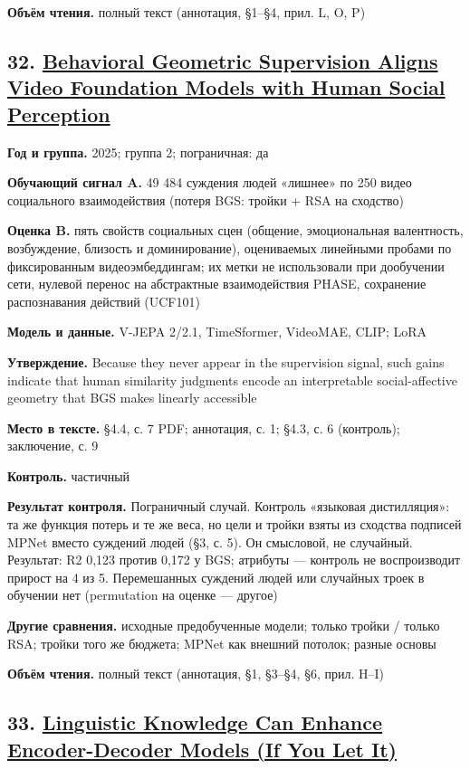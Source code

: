 \textbf{Объём чтения.} полный текст (аннотация, §1–§4, прил. L, O, P)


\subsection*{32. \href{https://doi.org/10.48550/arxiv.2510.01502}{Behavioral Geometric Supervision Aligns Video Foundation Models with Human Social Perception}}

\textbf{Год и группа.} 2025; группа 2; пограничная: да

\textbf{Обучающий сигнал A.} 49 484 суждения людей «лишнее» по 250 видео социального взаимодействия (потеря BGS: тройки + RSA на сходство)

\textbf{Оценка B.} пять свойств социальных сцен (общение, эмоциональная валентность, возбуждение, близость и доминирование), оцениваемых линейными пробами по фиксированным видеоэмбеддингам; их метки не использовали при дообучении сети, нулевой перенос на абстрактные взаимодействия PHASE, сохранение распознавания действий (UCF101)

\textbf{Модель и данные.} V-JEPA 2/2.1, TimeSformer, VideoMAE, CLIP; LoRA

\textbf{Утверждение.} Because they never appear in the supervision signal, such gains indicate that human similarity judgments encode an interpretable social-affective geometry that BGS makes linearly accessible

\textbf{Место в тексте.} §4.4, с. 7 PDF; аннотация, с. 1; §4.3, с. 6 (контроль); заключение, с. 9

\textbf{Контроль.} частичный

\textbf{Результат контроля.} Пограничный случай. Контроль «языковая дистилляция»: та же функция потерь и те же веса, но цели и тройки взяты из сходства подписей MPNet вместо суждений людей (§3, с. 5). Он смысловой, не случайный. Результат: R2 0,123 против 0,172 у BGS; атрибуты — контроль не воспроизводит прирост на 4 из 5. Перемешанных суждений людей или случайных троек в обучении нет (permutation на оценке — другое)

\textbf{Другие сравнения.} исходные предобученные модели; только тройки / только RSA; тройки того же бюджета; MPNet как внешний потолок; разные основы

\textbf{Объём чтения.} полный текст (аннотация, §1, §3–§4, §6, прил. H–I)


\subsection*{33. \href{https://doi.org/10.63317/5f2if588t6s5}{Linguistic Knowledge Can Enhance Encoder-Decoder Models (If You Let It)}}

